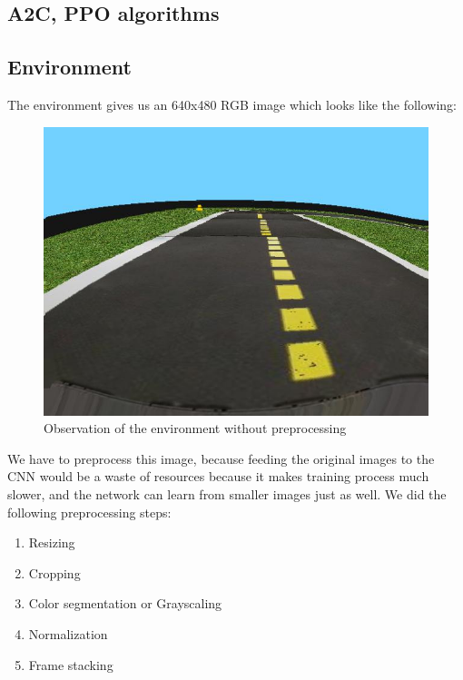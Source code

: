 \documentclass{article}
\begin{document}
\subsection{\normalsize{A2C, PPO algorithms}}

\subsection{\normalsize{Environment}}

The environment gives us an 640x480 RGB image which looks like the following:
\begin{figure}[h!]
	\centering
	\includegraphics[width=0.5\linewidth]{rawobs.jpg}
	\caption{Observation of the environment without preprocessing}
\end{figure}
We have to preprocess this image, because feeding the original images to the CNN would be a waste of resources because it makes training process much slower, and the network can learn from smaller images just as well. We did the following preprocessing steps:
\begin{enumerate}
	\item Resizing
	\item Cropping
	\item Color segmentation or Grayscaling
	\item Normalization
	\item Frame stacking
\end{enumerate}
\end{document}
